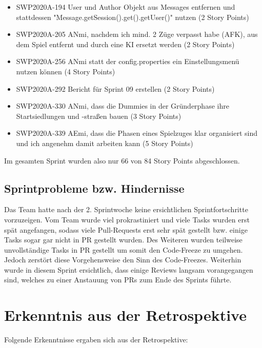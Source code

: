 \documentclass[12pt,a4paper, oneside]{article}
\begin{document}
    \begin{itemize}

        \item SWP2020A-194 User und Author Objekt aus Messages entfernen und stattdessen "Message.getSession().get().getUser()" nutzen (2 Story Points)

        \item SWP2020A-205 ANmi, nachdem ich mind. 2 Züge verpasst habe (AFK), aus dem Spiel entfernt und durch eine KI ersetzt werden (2 Story Points)

        \item SWP2020A-256 ANmi statt der config.properties ein Einstellungsmenü nutzen können (4 Story Points)

        \item SWP2020A-292 Bericht für Sprint 09 erstellen (2 Story Points)

        \item SWP2020A-330 ANmi, dass die Dummies in der Gründerphase ihre Startsiedlungen und -straßen bauen (3 Story Points)

        \item SWP2020A-339 AEmi, dass die Phasen eines Spielzuges klar organisiert sind und ich angenehm damit arbeiten kann (5 Story Points)

    \end{itemize}

    \noindent
    Im gesamten Sprint wurden also nur 66 von 84 Story Points abgeschlossen.

    \newpage
    \subsection{Sprintprobleme bzw. Hindernisse}
    Das Team hatte nach der 2. Sprintwoche keine ersichtlichen Sprintfortschritte vorzuzeigen. Vom Team wurde viel prokrastiniert und viele Tasks wurden erst spät angefangen, sodass viele Pull-Requests erst sehr spät gestellt bzw. einige Tasks sogar gar nicht in PR gestellt wurden. Des Weiteren wurden teilweise unvollständige Tasks in PR gestellt um somit den Code-Freeze zu umgehen. Jedoch zerstört diese Vorgehensweise den Sinn des Code-Freezes.
    Weiterhin wurde in diesem Sprint ersichtlich, dass einige Reviews langsam vorangegangen sind, welches zu einer Anstauung von PRs zum Ende des Sprints führte.

    \section{Erkenntnis aus der Retrospektive}
    Folgende Erkenntnisse ergaben sich aus der Retrospektive:\\
\end{document}
